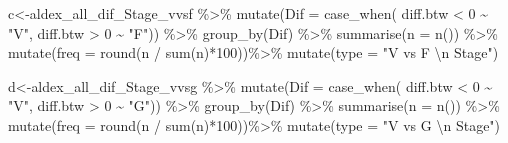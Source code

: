 \documentclass[]{interact}
\theoremstyle{plain}%
\theoremstyle{definition}
\theoremstyle{remark}
\newenvironment{Shaded}{\begin{snugshade}}{\end{snugshade}}
\newcommand{\AttributeTok}[1]{\textcolor[rgb]{0.77,0.63,0.00}{#1}}
\newcommand{\DecValTok}[1]{\textcolor[rgb]{0.00,0.00,0.81}{#1}}
\newcommand{\FunctionTok}[1]{\textcolor[rgb]{0.00,0.00,0.00}{#1}}
\newcommand{\NormalTok}[1]{#1}
\newcommand{\OtherTok}[1]{\textcolor[rgb]{0.56,0.35,0.01}{#1}}
\newcommand{\SpecialCharTok}[1]{\textcolor[rgb]{0.00,0.00,0.00}{#1}}
\newcommand{\StringTok}[1]{\textcolor[rgb]{0.31,0.60,0.02}{#1}}
\begin{document}
\begin{Shaded}
\begin{Highlighting}[]
\NormalTok{c}\OtherTok{\textless{}{-}}\NormalTok{aldex\_all\_dif\_Stage\_vvsf }\SpecialCharTok{\%\textgreater{}\%}  \FunctionTok{mutate}\NormalTok{(}\AttributeTok{Dif =} \FunctionTok{case\_when}\NormalTok{(}
\NormalTok{  diff.btw }\SpecialCharTok{\textless{}} \DecValTok{0} \SpecialCharTok{\textasciitilde{}} \StringTok{"V"}\NormalTok{,}
\NormalTok{  diff.btw }\SpecialCharTok{\textgreater{}} \DecValTok{0}  \SpecialCharTok{\textasciitilde{}} \StringTok{"F"}\NormalTok{)) }\SpecialCharTok{\%\textgreater{}\%} \FunctionTok{group\_by}\NormalTok{(Dif) }\SpecialCharTok{\%\textgreater{}\%}
  \FunctionTok{summarise}\NormalTok{(}\AttributeTok{n =} \FunctionTok{n}\NormalTok{()) }\SpecialCharTok{\%\textgreater{}\%}
  \FunctionTok{mutate}\NormalTok{(}\AttributeTok{freq =} \FunctionTok{round}\NormalTok{(n }\SpecialCharTok{/} \FunctionTok{sum}\NormalTok{(n)}\SpecialCharTok{*}\DecValTok{100}\NormalTok{))}\SpecialCharTok{\%\textgreater{}\%} \FunctionTok{mutate}\NormalTok{(}\AttributeTok{type =} \StringTok{"V vs F }\SpecialCharTok{\textbackslash{}n}\StringTok{  Stage"}\NormalTok{)}

\NormalTok{d}\OtherTok{\textless{}{-}}\NormalTok{aldex\_all\_dif\_Stage\_vvsg }\SpecialCharTok{\%\textgreater{}\%}  \FunctionTok{mutate}\NormalTok{(}\AttributeTok{Dif =} \FunctionTok{case\_when}\NormalTok{(}
\NormalTok{  diff.btw }\SpecialCharTok{\textless{}} \DecValTok{0} \SpecialCharTok{\textasciitilde{}} \StringTok{"V"}\NormalTok{,}
\NormalTok{  diff.btw }\SpecialCharTok{\textgreater{}} \DecValTok{0}  \SpecialCharTok{\textasciitilde{}} \StringTok{"G"}\NormalTok{)) }\SpecialCharTok{\%\textgreater{}\%} \FunctionTok{group\_by}\NormalTok{(Dif) }\SpecialCharTok{\%\textgreater{}\%}
  \FunctionTok{summarise}\NormalTok{(}\AttributeTok{n =} \FunctionTok{n}\NormalTok{()) }\SpecialCharTok{\%\textgreater{}\%}
  \FunctionTok{mutate}\NormalTok{(}\AttributeTok{freq =} \FunctionTok{round}\NormalTok{(n }\SpecialCharTok{/} \FunctionTok{sum}\NormalTok{(n)}\SpecialCharTok{*}\DecValTok{100}\NormalTok{))}\SpecialCharTok{\%\textgreater{}\%} \FunctionTok{mutate}\NormalTok{(}\AttributeTok{type =} \StringTok{"V vs G }\SpecialCharTok{\textbackslash{}n}\StringTok{  Stage"}\NormalTok{)}


\end{Highlighting}
\end{Shaded}
\end{document}
